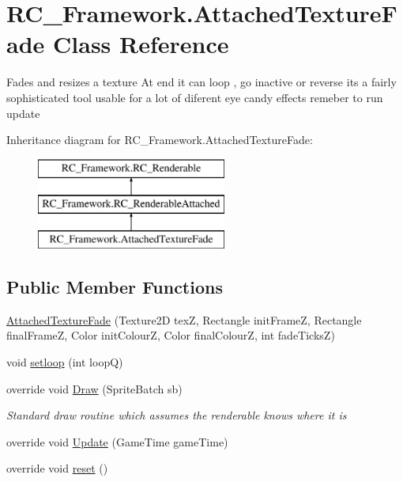 \hypertarget{class_r_c___framework_1_1_attached_texture_fade}{}\section{R\+C\+\_\+\+Framework.\+Attached\+Texture\+Fade Class Reference}
\label{class_r_c___framework_1_1_attached_texture_fade}


Fades and resizes a texture At end it can loop , go inactive or reverse its a fairly sophisticated tool usable for a lot of diferent eye candy effects remeber to run update  


Inheritance diagram for R\+C\+\_\+\+Framework.\+Attached\+Texture\+Fade\+:\begin{figure}[H]
\begin{center}
\leavevmode
\includegraphics[height=3.000000cm]{class_r_c___framework_1_1_attached_texture_fade}
\end{center}
\end{figure}
\subsection*{Public Member Functions}
\begin{DoxyCompactItemize}
\item 
\mbox{\hyperlink{class_r_c___framework_1_1_attached_texture_fade_a48153baf36d718ea055287af0688a691}{Attached\+Texture\+Fade}} (Texture2D texZ, Rectangle init\+FrameZ, Rectangle final\+FrameZ, Color init\+ColourZ, Color final\+ColourZ, int fade\+TicksZ)
\item 
void \mbox{\hyperlink{class_r_c___framework_1_1_attached_texture_fade_a8b51be50a28199ec67abb43faeedfa73}{setloop}} (int loopQ)
\item 
override void \mbox{\hyperlink{class_r_c___framework_1_1_attached_texture_fade_a93612655099524c9059b6ae9437bda59}{Draw}} (Sprite\+Batch sb)
\begin{DoxyCompactList}\small\item\em Standard draw routine which assumes the renderable knows where it is \end{DoxyCompactList}\item 
override void \mbox{\hyperlink{class_r_c___framework_1_1_attached_texture_fade_a7da61ac25b6b39b6984b5c26547e2291}{Update}} (Game\+Time game\+Time)
\item 
override void \mbox{\hyperlink{class_r_c___framework_1_1_attached_texture_fade_ad5760d7529afe100e6dd7fbe4ecc7b38}{reset}} ()
\end{DoxyCompactItemize}

